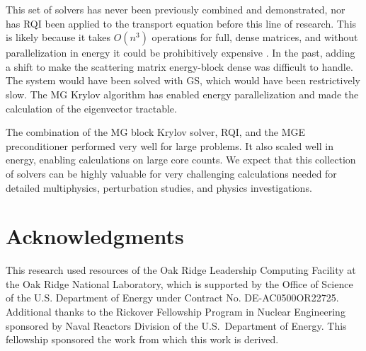 \documentclass{article}                                                                           %
\begin{document}
%

This set of solvers has never been previously combined and demonstrated, nor has RQI been applied to the transport equation before this line of research. This is likely because it takes $O(n^{3})$ operations for full, dense matrices, and without parallelization in energy it could be prohibitively expensive \cite{Stewart2001}. In the past, adding a shift to make the scattering matrix energy-block dense was difficult to handle. The system would have been solved with GS, which would have been restrictively slow. The MG Krylov algorithm has enabled energy parallelization and made the calculation of the eigenvector tractable. 

The combination of the MG block Krylov solver, RQI, and the MGE preconditioner performed very well for large problems. It also scaled well in energy, enabling calculations on large core counts. We expect that this collection of solvers can be highly valuable for very challenging calculations needed for detailed multiphysics, perturbation studies, and physics investigations. 





\pagebreak
\section*{Acknowledgments}

This research used resources of the Oak Ridge Leadership Computing Facility at the Oak Ridge National Laboratory, which is supported by the Office of Science of the U.S. Department of Energy under Contract No. DE-AC0500OR22725. Additional thanks to the Rickover Fellowship Program in Nuclear Engineering sponsored by Naval Reactors Division of the U.S.\ Department of Energy. This fellowship sponsored the work from which this work is derived.

\pagebreak



\end{document}

